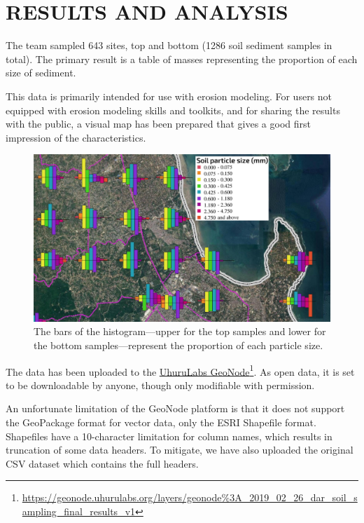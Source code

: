 \documentclass[a4paper,12pt,twoside]{article}
\begin{document}
\newpage 
\color{RHblue}
\section{RESULTS AND ANALYSIS}
\label{resultsandanalysis}
\color{RHgrey}
The team sampled 643 sites, top and bottom (1286 soil sediment samples in total). The primary result is a table of masses representing the proportion of each size of sediment.

This data is primarily intended for use with erosion modeling. For users not equipped with erosion modeling skills and toolkits, and for sharing the results with the public, a visual map has been prepared that gives a good first impression of the characteristics.

\begin{figure}[h]
  \scriptsize\color{RHgreen}\caption{The bars of the histogram---upper for the top samples and lower for the bottom samples---represent the proportion of each particle size.}
  \centering
  \includegraphics[width=1\textwidth]{soil_map_detail_peninsula_with_legend}
\end{figure}

\color{RHgrey}
The data has been uploaded to the \href{https://geonode.uhurulabs.org/layers/geonode\%3A_2019_02_26_dar_soil_sampling_final_results_v1}{UhuruLabs GeoNode}\footnote{\url {https://geonode.uhurulabs.org/layers/geonode\%3A_2019_02_26_dar_soil_sampling_final_results_v1}}. As open data, it is set to be downloadable by anyone, though only modifiable with permission.

An unfortunate limitation of the GeoNode platform is that it does not support the GeoPackage format for vector data, only the ESRI Shapefile format. Shapefiles have a 10-character limitation for column names, which results in truncation of some data headers. To mitigate, we have also uploaded the original CSV dataset which contains the full headers. 
\end{document}
